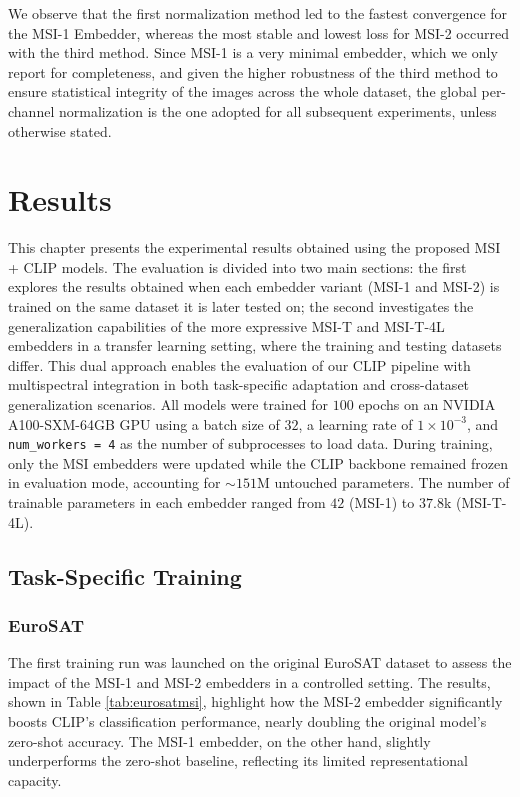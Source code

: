 \documentclass[a4paper, twoside, english]{sapthesis} %
\begin{document}
We observe that the first normalization method led to the fastest convergence for the MSI-1 Embedder, whereas the most stable and lowest loss for MSI-2 occurred with the third method. Since MSI-1 is a very minimal embedder, which we only report for completeness, and given the higher robustness of the third method to ensure statistical integrity of the images across the whole dataset, the global per-channel normalization is the one adopted for all subsequent experiments, unless otherwise stated.


\chapter{Results}\label{Results} %

This chapter presents the experimental results obtained using the proposed MSI + CLIP models. The evaluation is divided into two main sections: the first explores the results obtained when each embedder variant (MSI-1 and MSI-2) is trained on the same dataset it is later tested on; the second investigates the generalization capabilities of the more expressive MSI-T and MSI-T-4L embedders in a transfer learning setting, where the training and testing datasets differ. This dual approach enables the evaluation of our CLIP pipeline with multispectral integration in both task-specific adaptation and cross-dataset generalization scenarios.
All models were trained for $100$ epochs on an NVIDIA A100-SXM-64GB GPU using a batch size of 
$32$, a learning rate of $1\times10^{-3}$, and \texttt{num\_workers = 4} as the number of subprocesses to load data. During training, only the MSI embedders were updated while the CLIP backbone remained frozen in evaluation mode, accounting for $\sim 151$M untouched parameters. The number of trainable parameters in each embedder ranged from $42$ (MSI-1) to $37.8$k (MSI-T-4L).



\section{Task-Specific Training}\label{sec:training}

\subsection{EuroSAT}

The first training run was launched on the original EuroSAT dataset to assess the impact of the MSI-1 and MSI-2 embedders in a controlled setting. The results, shown in Table \ref{tab:eurosatmsi}, highlight how the MSI-2 embedder significantly boosts CLIP's classification performance, nearly doubling the original model's zero-shot accuracy. The MSI-1 embedder, on the other hand, slightly underperforms the zero-shot baseline, reflecting its limited representational capacity.
\end{document}
